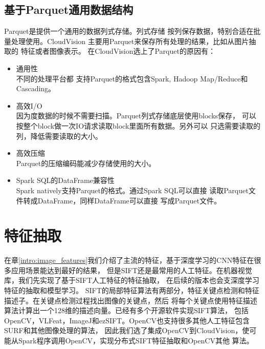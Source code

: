 \subsection{基于Parquet通用数据结构}
\label{subsec:parquet}
Parquet是提供一个通用的数据列式存储。列式存储
按列保存数据，特别合适在批量处理使用。CloudVision
主要用Parquet来保存所有处理的结果，比如从图片抽取的
特征或者图像表示。
在CloudVision选上了Parquet的原因有：
\begin{itemize}
  \item 通用性 \\
        不同的处理平台都
        支持Parquet的格式包含Spark, Hadoop Map/Reduce和Cascading。
  \item 高效I/O \\
        因为度数据的时候不需要扫描。Parquet列式存储底层使用blocks保存，
        可以按整个block做一次IO请求读取block里面所有数据。另外可以
        只选需要读取的列，降低需要读取的大小。
  \item 高效压缩 \\
        Parquet的压缩编码能减少存储使用的大小。
  \item Spark SQL的DataFrame兼容性 \\
        Spark natively支持Parquet的格式。通过Spark SQL可以直接
        读取Parquet文件转成DataFrame，同样DataFrame可以直接
        写成Parquet文件。
\end{itemize}



\section{特征抽取}
\label{sec:feature-extraction}
在章\ref{intro:image_features}我们介绍了主流的特征，基于深度学习的CNN特征在很多应用场景能达到最好的结果，
但是SIFT还是最常用的人工特征。在机器视觉库，我们先实现了基于SIFT人工特征的特征抽取，
在后续的版本也会支深度学习特征的抽取和模型学习。
SIFT的局部特征算法有两部分，特征关键点检测和特征描述子。在关键点检测过程找出图像的关键点，然后
将每个关键点使用特征描述算法计算出一个128维的描述向量。已经有多个开源软件实现SIFT算法，
包括OpenCV，VLFeat，ImageJ和ezSIFT。OpenCV也支持很多其他人工特征包含SURF和其他图像处理的算法，
因此我们选了集成OpenCV到CloudVision，使可能从Spark程序调用OpenCV，实现分布式SIFT特征抽取和OpenCV其他
算法。

